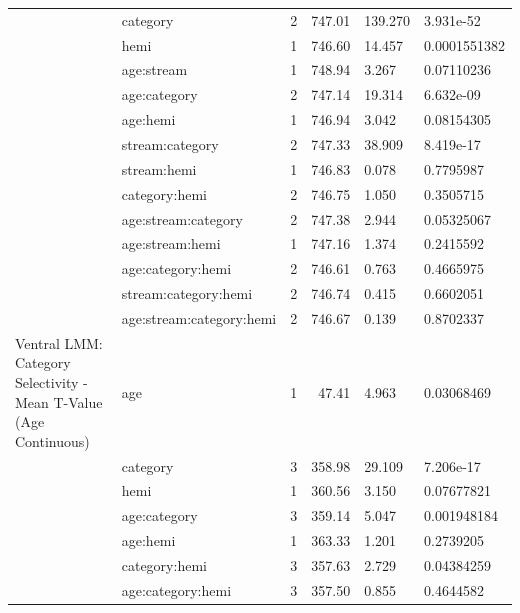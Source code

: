 \begin{table}
\begin{tabular}{llrrll}
 & category & 2 & 747.01 & 139.270 & 3.931e-52\\
\addlinespace
 & hemi & 1 & 746.60 & 14.457 & 0.0001551382\\
 & age:stream & 1 & 748.94 & 3.267 & 0.07110236\\
 & age:category & 2 & 747.14 & 19.314 & 6.632e-09\\
 & age:hemi & 1 & 746.94 & 3.042 & 0.08154305\\
 & stream:category & 2 & 747.33 & 38.909 & 8.419e-17\\
\addlinespace
 & stream:hemi & 1 & 746.83 & 0.078 & 0.7795987\\
 & category:hemi & 2 & 746.75 & 1.050 & 0.3505715\\
 & age:stream:category & 2 & 747.38 & 2.944 & 0.05325067\\
 & age:stream:hemi & 1 & 747.16 & 1.374 & 0.2415592\\
 & age:category:hemi & 2 & 746.61 & 0.763 & 0.4665975\\
\addlinespace
 & stream:category:hemi & 2 & 746.74 & 0.415 & 0.6602051\\
 & age:stream:category:hemi & 2 & 746.67 & 0.139 & 0.8702337\\
Ventral LMM: Category Selectivity - Mean T-Value  (Age Continuous) & age & 1 & 47.41 & 4.963 & 0.03068469\\
 & category & 3 & 358.98 & 29.109 & 7.206e-17\\
 & hemi & 1 & 360.56 & 3.150 & 0.07677821\\
\addlinespace
 & age:category & 3 & 359.14 & 5.047 & 0.001948184\\
 & age:hemi & 1 & 363.33 & 1.201 & 0.2739205\\
 & category:hemi & 3 & 357.63 & 2.729 & 0.04384259\\
 & age:category:hemi & 3 & 357.50 & 0.855 & 0.4644582\\
\bottomrule
\end{tabular}
\end{table}
